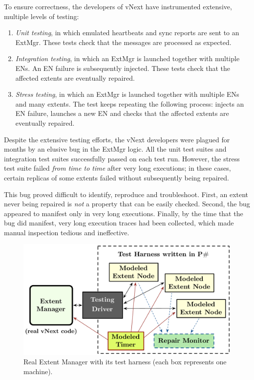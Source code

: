 To ensure correctness, the developers of vNext have instrumented extensive, multiple levels of testing:
\begin{enumerate}
\item \emph{Unit testing}, in which emulated heartbeats and sync reports are sent to an ExtMgr. These tests check that the messages are processed as expected.

\item \emph{Integration testing}, in which an ExtMgr is launched together with multiple ENs. An EN failure is subsequently injected. These tests check that the affected extents are eventually repaired.

\item \emph{Stress testing}, in which an ExtMgr is launched together with multiple ENs and many extents. The test keeps repeating the following process: injects an EN failure, launches a new EN and checks that the affected extents are eventually repaired.
\end{enumerate}

\noindent
Despite the extensive testing efforts, the vNext developers were plagued for months by an elusive bug in the ExtMgr logic. All the unit test suites and integration test suites successfully passed on each test run. However, the stress test suite failed \emph{from time to time} after very long executions; in these cases, certain replicas of some extents failed without subsequently being repaired.

This bug proved difficult to identify, reproduce and troubleshoot. First, an extent never being repaired is \emph{not} a property that can be easily checked. Second, the bug appeared to manifest only in very long executions. Finally, by the time that the bug did manifest, very long execution traces had been collected, which made manual inspection tedious and ineffective.

\begin{figure}[t]
\centering
\includegraphics[width=\linewidth]{img/modeled_vnext}
\vspace{-5mm}
\caption{Real Extent Manager with its \psharp test harness (each box represents one \psharp machine).}
\label{fig:azurestoremodel}
\vspace{-2mm}
\end{figure}

